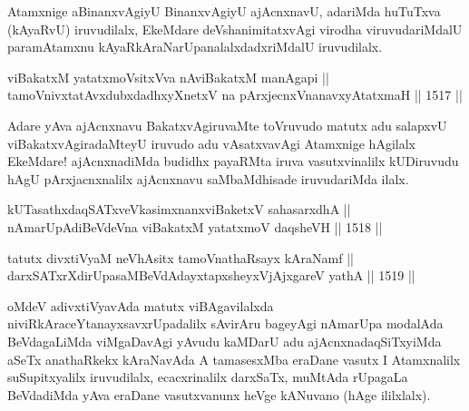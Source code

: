 \begin{artha}
Atamxnige aBinanxvAgiyU BinanxvAgiyU ajAcnxnavU, adariMda huTuTxva (kAyaRvU) iruvudilalx, EkeMdare deVshanimitatxvAgi virodha viruvudariMdalU paramAtamxnu kAyaRkAraNarUpanalalxdadxriMdalU iruvudilalx.
\end{artha}


\begin{shl}
viBakatxM yatatxmoV\s sitxVva nAviBakatxM manAgapi || \\
tamoV\s nivxtatAvxdubxdadhxyXnetxV na pArxjecnxV\s nanavxyAtatxmaH \hfill || 1517 ||  
\end{shl}

\begin{artha}
Adare yAva ajAcnxnavu BakatxvAgiruvaMte toVruvudo matutx adu salapxvU viBakatxvAgiradaMteyU iruvudo adu vAsatxvavAgi Atamxnige hAgilalx EkeMdare! ajAcnxnadiMda budidhx payaRMta iruva vasutxvinalilx kUDiruvudu hAgU pArxjacnxnalilx ajAcnxnavu saMbaMdhisade iruvudariMda ilalx.
\end{artha}


\begin{shl}
kUTasathxdaqSATxveVkasimxnanxviBaketxV sahasarxdhA || \\
nAmarUpAdiBeVdeVna viBakatxM yatatxmoV daqsheVH \hfill || 1518 ||  
\end{shl}
				
\begin{shl}
tatutx divxtiVyaM neVhAsitx tamoV\s nathaRsayx kAraNamf || \\
darxSATxrXdirUpasaMBeVdAdayxtapxsheyxVjAjxgareV yathA \hfill || 1519 ||  
\end{shl}

\begin{artha}
oMdeV adivxtiVyavAda matutx viBAgavilalxda niviRkAraceYtanayxsavxrUpadalilx sAvirAru bageyAgi nAmarUpa modalAda BeVdagaLiMda viMgaDavAgi yAvudu kaMDarU adu ajAcnxnadaqSiTxyiMda aSeTx anathaRkekx kAraNavAda A tamasesxMba eraDane vasutx I Atamxnalilx suSupitxyalilx iruvudilalx, ecacxrinalilx darxSaTx, muMtAda rUpagaLa BeVdadiMda yAva eraDane vasutxvanunx heVge kANuvano (hAge ililxlalx).
\end{artha}


